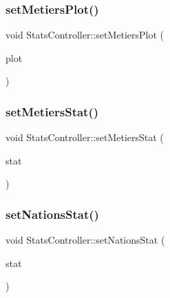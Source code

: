 \mbox{\label{class_stats_controller_a077bb29233dbc213fa883f1aa9d7fb84}} 
\subsubsection{\texorpdfstring{setMetiersPlot()}{setMetiersPlot()}}
{\footnotesize\ttfamily void Stats\+Controller\+::set\+Metiers\+Plot (\begin{DoxyParamCaption}\item[{\mbox{\hyperlink{class_plot_widget}{Plot\+Widget}} $\ast$}]{plot }\end{DoxyParamCaption})}

\mbox{\label{class_stats_controller_aa06565bb5265103ee57c521353645c8c}} 
\subsubsection{\texorpdfstring{setMetiersStat()}{setMetiersStat()}}
{\footnotesize\ttfamily void Stats\+Controller\+::set\+Metiers\+Stat (\begin{DoxyParamCaption}\item[{\mbox{\hyperlink{namespacedisplace_1_1plot_a673bbc813b7f03be3dc76ae7fd087516}{displace\+::plot\+::\+Metiers\+Stat}}}]{stat }\end{DoxyParamCaption})}

\mbox{\label{class_stats_controller_afbfc66b599bb7782828e38e8837ab141}} 
\subsubsection{\texorpdfstring{setNationsStat()}{setNationsStat()}}
{\footnotesize\ttfamily void Stats\+Controller\+::set\+Nations\+Stat (\begin{DoxyParamCaption}\item[{\mbox{\hyperlink{namespacedisplace_1_1plot_ab7b96ae3ae291a71823f371d77f27d98}{displace\+::plot\+::\+Nations\+Stat}}}]{stat }\end{DoxyParamCaption})}

